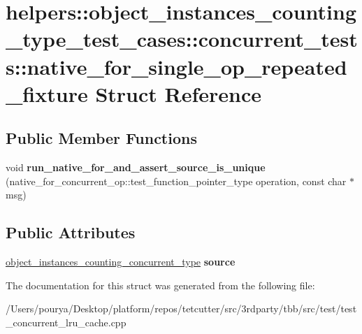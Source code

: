 \hypertarget{structhelpers_1_1object__instances__counting__type__test__cases_1_1concurrent__tests_1_1native__0563a6a3544f4ca543c021c76036ad47}{}\section{helpers\+:\+:object\+\_\+instances\+\_\+counting\+\_\+type\+\_\+test\+\_\+cases\+:\+:concurrent\+\_\+tests\+:\+:native\+\_\+for\+\_\+single\+\_\+op\+\_\+repeated\+\_\+fixture Struct Reference}
\label{structhelpers_1_1object__instances__counting__type__test__cases_1_1concurrent__tests_1_1native__0563a6a3544f4ca543c021c76036ad47}
\subsection*{Public Member Functions}
\begin{DoxyCompactItemize}
\item 
\hypertarget{structhelpers_1_1object__instances__counting__type__test__cases_1_1concurrent__tests_1_1native__0563a6a3544f4ca543c021c76036ad47_a8c79f65cafb429718c2a7678372a170c}{}void {\bfseries run\+\_\+native\+\_\+for\+\_\+and\+\_\+assert\+\_\+source\+\_\+is\+\_\+unique} (native\+\_\+for\+\_\+concurrent\+\_\+op\+::test\+\_\+function\+\_\+pointer\+\_\+type operation, const char $\ast$msg)\label{structhelpers_1_1object__instances__counting__type__test__cases_1_1concurrent__tests_1_1native__0563a6a3544f4ca543c021c76036ad47_a8c79f65cafb429718c2a7678372a170c}

\end{DoxyCompactItemize}
\subsection*{Public Attributes}
\begin{DoxyCompactItemize}
\item 
\hypertarget{structhelpers_1_1object__instances__counting__type__test__cases_1_1concurrent__tests_1_1native__0563a6a3544f4ca543c021c76036ad47_ac27411454143d73ed58271c890ee2800}{}\hyperlink{structhelpers_1_1object__instances__counting__type}{object\+\_\+instances\+\_\+counting\+\_\+concurrent\+\_\+type} {\bfseries source}\label{structhelpers_1_1object__instances__counting__type__test__cases_1_1concurrent__tests_1_1native__0563a6a3544f4ca543c021c76036ad47_ac27411454143d73ed58271c890ee2800}

\end{DoxyCompactItemize}


The documentation for this struct was generated from the following file\+:\begin{DoxyCompactItemize}
\item 
/\+Users/pourya/\+Desktop/platform/repos/tetcutter/src/3rdparty/tbb/src/test/test\+\_\+concurrent\+\_\+lru\+\_\+cache.\+cpp\end{DoxyCompactItemize}
